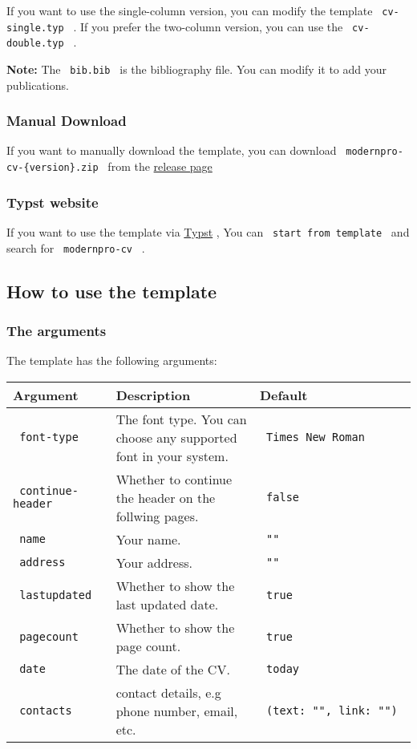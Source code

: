 If you want to use the single-column version, you can modify the
template \texttt{\ cv-single.typ\ } . If you prefer the two-column
version, you can use the \texttt{\ cv-double.typ\ } .

\textbf{Note:} The \texttt{\ bib.bib\ } is the bibliography file. You
can modify it to add your publications.

\subsubsection{Manual Download}\label{manual-download}

If you want to manually download the template, you can download
\texttt{\ modernpro-cv-\{version\}.zip\ } from the
\href{https://github.com/jxpeng98/Typst-CV-Resume/releases}{release
page}

\subsubsection{Typst website}\label{typst-website}

If you want to use the template via \href{https://typst.app/}{Typst} ,
You can \texttt{\ start\ from\ template\ } and search for
\texttt{\ modernpro-cv\ } .

\subsection{How to use the template}\label{how-to-use-the-template}

\subsubsection{The arguments}\label{the-arguments}

The template has the following arguments:

\begin{longtable}[]{@{}lll@{}}
\toprule\noalign{}
Argument & Description & Default \\
\midrule\noalign{}
\endhead
\bottomrule\noalign{}
\endlastfoot
\texttt{\ font-type\ } & The font type. You can choose any supported
font in your system. & \texttt{\ Times\ New\ Roman\ } \\
\texttt{\ continue-header\ } & Whether to continue the header on the
follwing pages. & \texttt{\ false\ } \\
\texttt{\ name\ } & Your name. & \texttt{\ ""\ } \\
\texttt{\ address\ } & Your address. & \texttt{\ ""\ } \\
\texttt{\ lastupdated\ } & Whether to show the last updated date. &
\texttt{\ true\ } \\
\texttt{\ pagecount\ } & Whether to show the page count. &
\texttt{\ true\ } \\
\texttt{\ date\ } & The date of the CV. & \texttt{\ today\ } \\
\texttt{\ contacts\ } & contact details, e.g phone number, email, etc. &
\texttt{\ (text:\ "",\ link:\ "")\ } \\
\end{longtable}

